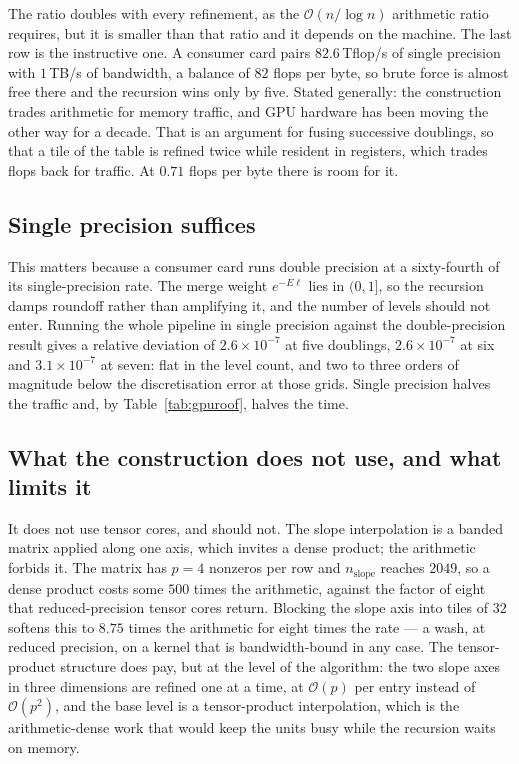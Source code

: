 \documentclass[11pt]{article}
\newcommand{\bigO}{\mathcal{O}}
\begin{document}
The ratio doubles with every refinement, as the $\bigO(n/\log n)$ arithmetic
ratio requires, but it is smaller than that ratio and it depends on the
machine. The last row is the instructive one. A consumer card pairs
$82.6$\,Tflop/s of single precision with $1$\,TB/s of bandwidth, a balance of
$82$ flops per byte, so brute force is almost free there and the recursion
wins only by five. Stated generally: the construction trades arithmetic for
memory traffic, and GPU hardware has been moving the other way for a decade.
That is an argument for fusing successive doublings, so that a tile of the
table is refined twice while resident in registers, which trades flops back
for traffic. At $0.71$ flops per byte there is room for it.

\subsection{Single precision suffices}

This matters because a consumer card runs double precision at a sixty-fourth
of its single-precision rate. The merge weight $e^{-E\ell}$ lies in $(0,1]$,
so the recursion damps roundoff rather than amplifying it, and the number of
levels should not enter. Running the whole pipeline in single precision
against the double-precision result gives a relative deviation of
$2.6\times10^{-7}$ at five doublings, $2.6\times10^{-7}$ at six and
$3.1\times10^{-7}$ at seven: flat in the level count, and two to three orders
of magnitude below the discretisation error at those grids. Single precision
halves the traffic and, by Table~\ref{tab:gpuroof}, halves the time.

\subsection{What the construction does not use, and what limits it}

It does not use tensor cores, and should not. The slope interpolation is a
banded matrix applied along one axis, which invites a dense product; the
arithmetic forbids it. The matrix has $p=4$ nonzeros per row and
$n_{\mathrm{slope}}$ reaches $2049$, so a dense product costs some $500$ times
the arithmetic, against the factor of eight that reduced-precision tensor
cores return. Blocking the slope axis into tiles of $32$ softens this to
$8.75$ times the arithmetic for eight times the rate --- a wash, at reduced
precision, on a kernel that is bandwidth-bound in any case. The tensor-product
structure does pay, but at the level of the algorithm: the two slope axes in
three dimensions are refined one at a time, at $\bigO(p)$ per entry instead of
$\bigO(p^2)$, and the base level is a tensor-product interpolation, which is
the arithmetic-dense work that would keep the units busy while the recursion
waits on memory.
\end{document}
